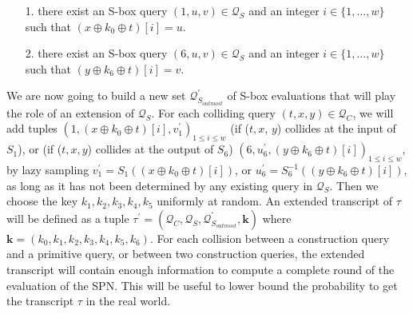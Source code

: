 \begin{itemize}
  \item[1.]
  there exist an S-box query $(1, u, v) \in \mathcal{Q}_{S}$ and an integer $i \in\{1, \ldots, w\}$ such that $\left(x \oplus k_{0} \oplus t \right)[i]=u$.
  \item[2.]
  there exist an S-box query $(6, u, v) \in \mathcal{Q}_{S}$ and an integer $i \in\{1, \ldots, w\}$ such that $\left(y \oplus k_{6} \oplus t \right)[i]=v$.
\end{itemize}

We are now going to build a new set $\mathcal{Q}_{S_{outmost}}^{\prime}$ of S-box evaluations that will play the role of an extension of $\mathcal{Q}_{S}$. For each colliding query $(t, x, y) \in \mathcal{Q}_{C}$, we will add tuples $\left(1, \left(x \oplus k_{0} \oplus t\right)[i], v_1^{\prime}\right)_{1 \leq i \leq w}$ (if ($t, \mathit{x}$, $\mathit{y}$) collides at the input of $S_1$), or (if ($t, \mathit{x}, \mathit{y}$) collides at the output of $S_6$) $\left(6, u_6^{\prime}, \left(y \oplus k_{6} \oplus t\right)[i]\right)_{1 \leq i \leq w}$, by lazy sampling $v_1^{\prime}=S_{1}(\left(x \oplus k_{0} \oplus t\right)[i])$, or $u_6^{\prime}=S_{6}^{-1}(\left(y \oplus k_{6} \oplus t\right)[i])$, as long as it has not been determined by any existing query in $\mathcal{Q}_{S}$. Then we choose the key $k_1, k_2, k_3, k_4, k_5$ uniformly at random. An extended transcript of $\tau$ will be defined as a tuple $\tau^{\prime}=\left(\mathcal{Q}_{C}, \mathcal{Q}_{S}, \mathcal{Q}_{S_{outmost}}^{\prime}, \mathbf{k}\right)$ where $\mathbf{k}=\left(k_{0}, k_{1}, k_{2},k_{3},k_{4}, k_{5}, k_{6}\right)$. For each collision between a construction query and a primitive query, or between two construction queries, the extended transcript will contain enough information to compute a complete round of the evaluation of the SPN. This will be useful to lower bound the probability to get the transcript $\tau$ in the real world.\\

